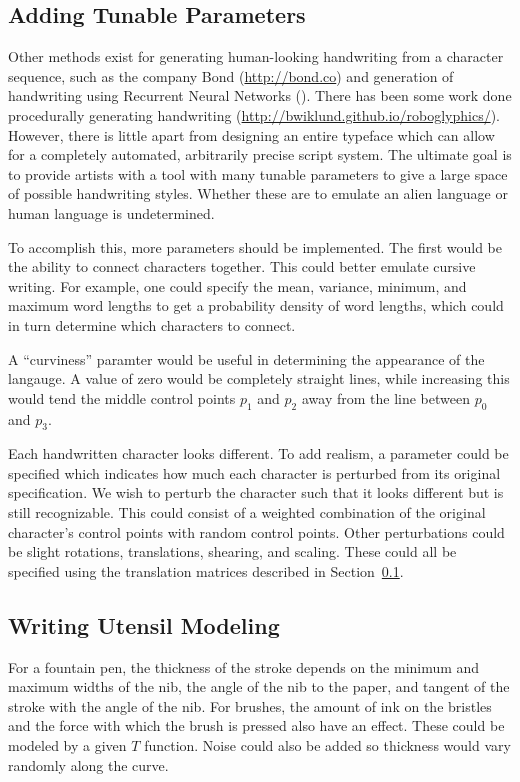 \documentclass[12pt]{article}
\begin{document}
\subsection{Adding Tunable Parameters}\label{generalize}
Other methods exist for generating human-looking handwriting from a character sequence, such as the company Bond (\url{http://bond.co}) and generation of handwriting using Recurrent Neural Networks (\cite{Graves:2013:RNN}). There has been some work done procedurally generating handwriting (\url{http://bwiklund.github.io/roboglyphics/}). However, there is little apart from designing an entire typeface which can allow for a completely automated, arbitrarily precise script system. The ultimate goal is to provide artists with a tool with many tunable parameters to give a large space of possible handwriting styles. Whether these are to emulate an alien language or human language is undetermined.

To accomplish this, more parameters should be implemented. The first would be the ability to connect characters together. This could better emulate cursive writing. For example, one could specify the mean, variance, minimum, and maximum word lengths to get a probability density of word lengths, which could in turn determine which characters to connect.

A ``curviness'' paramter would be useful in determining the appearance of the langauge. A value of zero would be completely straight lines, while increasing this would tend the middle control points $p_1$ and $p_2$ away from the line between $p_0$ and $p_3$.

Each handwritten character looks different. To add realism, a parameter could be specified which indicates how much each character is perturbed from its original specification. We wish to perturb the character such that it looks different but is still recognizable. This could consist of a weighted combination of the original character's control points with random control points. Other perturbations could be slight rotations, translations, shearing, and scaling. These could all be specified using the translation matrices described in Section~\ref{generalize}.

\subsection{Writing Utensil Modeling}
For a fountain pen, the thickness of the stroke depends on the minimum and maximum widths of the nib, the angle of the nib to the paper, and tangent of the stroke with the angle of the nib. For brushes, the amount of ink on the bristles and the force with which the brush is pressed also have an effect. These could be modeled by a given $T$ function. Noise could also be added so thickness would vary randomly along the curve.
\end{document}
